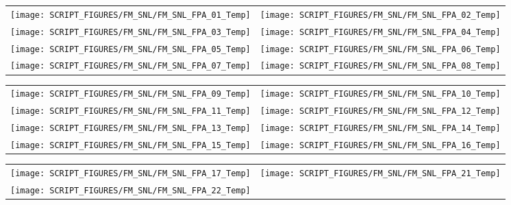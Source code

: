 \begin{figure}[!ht]
\begin{tabular*}{\textwidth}{l@{\extracolsep{\fill}}r}
\texttt{[image: SCRIPT\_FIGURES/FM\_SNL/FM\_SNL\_FPA\_01\_Temp]} &
\texttt{[image: SCRIPT\_FIGURES/FM\_SNL/FM\_SNL\_FPA\_02\_Temp]} \\
\texttt{[image: SCRIPT\_FIGURES/FM\_SNL/FM\_SNL\_FPA\_03\_Temp]} &
\texttt{[image: SCRIPT\_FIGURES/FM\_SNL/FM\_SNL\_FPA\_04\_Temp]} \\
\texttt{[image: SCRIPT\_FIGURES/FM\_SNL/FM\_SNL\_FPA\_05\_Temp]} &
\texttt{[image: SCRIPT\_FIGURES/FM\_SNL/FM\_SNL\_FPA\_06\_Temp]} \\
\texttt{[image: SCRIPT\_FIGURES/FM\_SNL/FM\_SNL\_FPA\_07\_Temp]} &
\texttt{[image: SCRIPT\_FIGURES/FM\_SNL/FM\_SNL\_FPA\_08\_Temp]}
\end{tabular*}
\end{figure}

\begin{figure}[!ht]
\begin{tabular*}{\textwidth}{l@{\extracolsep{\fill}}r}
\texttt{[image: SCRIPT\_FIGURES/FM\_SNL/FM\_SNL\_FPA\_09\_Temp]} &
\texttt{[image: SCRIPT\_FIGURES/FM\_SNL/FM\_SNL\_FPA\_10\_Temp]} \\
\texttt{[image: SCRIPT\_FIGURES/FM\_SNL/FM\_SNL\_FPA\_11\_Temp]} &
\texttt{[image: SCRIPT\_FIGURES/FM\_SNL/FM\_SNL\_FPA\_12\_Temp]} \\
\texttt{[image: SCRIPT\_FIGURES/FM\_SNL/FM\_SNL\_FPA\_13\_Temp]} &
\texttt{[image: SCRIPT\_FIGURES/FM\_SNL/FM\_SNL\_FPA\_14\_Temp]} \\
\texttt{[image: SCRIPT\_FIGURES/FM\_SNL/FM\_SNL\_FPA\_15\_Temp]} &
\texttt{[image: SCRIPT\_FIGURES/FM\_SNL/FM\_SNL\_FPA\_16\_Temp]}
\end{tabular*}
\end{figure}

\begin{figure}[!ht]
\begin{tabular*}{\textwidth}{l@{\extracolsep{\fill}}r}
\texttt{[image: SCRIPT\_FIGURES/FM\_SNL/FM\_SNL\_FPA\_17\_Temp]} &
\texttt{[image: SCRIPT\_FIGURES/FM\_SNL/FM\_SNL\_FPA\_21\_Temp]} \\
\texttt{[image: SCRIPT\_FIGURES/FM\_SNL/FM\_SNL\_FPA\_22\_Temp]}
\end{tabular*}
\end{figure}

